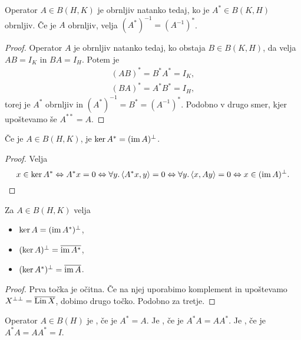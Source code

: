 \begin{posledica}
  Operator $A \in B(H,K)$ je obrnljiv natanko tedaj, ko je $A^* \in B(K,H)$
  obrnljiv.
  Če je $A$ obrnljiv, velja $(A^*)^{-1} = (A^{-1})^*$.
\end{posledica}

\begin{proof}
  Operator $A$ je obrnljiv natanko tedaj, ko obstaja $B \in B(K,H)$, da velja
  $AB = I_K$ in $BA = I_H$.
  Potem je
  \begin{gather*}
	(AB)^* = B^* A^* = I_K, \\
	(BA)^* = A^* B^* = I_H,
  \end{gather*}
  torej je $A^*$ obrnljiv in $(A^*)^{-1} = B^* = (A^{-1})^*$.
  Podobno v drugo smer, kjer upoštevamo še $A^{**} = A$.
\end{proof}

\begin{trditev}
  Če je $A \in B(H,K)$, je $\operatorname{ker} A^* = (\operatorname{im} A)^\bot$.
\end{trditev}

\begin{proof}
  Velja
  \[
	x \in \operatorname{ker} A^*
	\Leftrightarrow A^* x = 0
	\Leftrightarrow \forall y. \left< A^* x, y \right> = 0
	\Leftrightarrow \forall y. \left< x, Ay \right> = 0
	\Leftrightarrow x \in (\operatorname{im} A)^\bot.
	\qedhere
  \]
\end{proof}


\begin{posledica}
  Za $A \in B(H,K)$ velja
  \begin{itemize}
  \item $\operatorname{ker} A = (\operatorname{im} A^*)^\bot$,
  \item $(\operatorname{ker} A)^\bot = \overline{\operatorname{im} A^*}$,
  \item $(\operatorname{ker} A^*)^\bot = \overline{\operatorname{im} A}$.
  \end{itemize}
\end{posledica}

\begin{proof}
  Prva točka je očitna.
  Če na njej uporabimo komplement in upoštevamo $X^{\bot \bot} =
  \overline{\operatorname{Lin} X}$, dobimo drugo točko.
  Podobno za tretje.
\end{proof}

\begin{definicija}
  Operator $A \in B(H)$ je , če je $A^* =A$.
  Je , če je $A^* A = A A^*$.
  Je , če je $A^* A = A A^* = I$.
\end{definicija}

